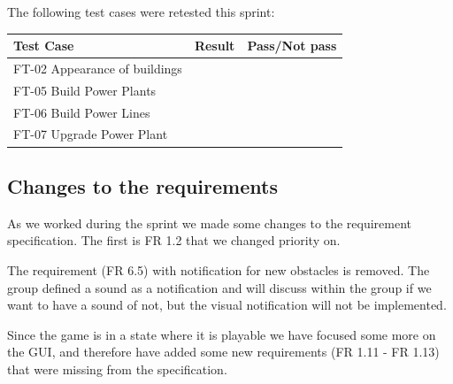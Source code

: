 	The following test cases were retested this sprint:

	\begin{tabular}{| p{3cm} | p{7cm} | p{2cm} |}
		\hline
		\rowcolor{lightgray}
		{\bf Test Case} & {\bf Result} & {\bf Pass/Not pass} \\ \hline

		FT-02  Appearance of buildings & & \\ \hline

	  	FT-05 Build Power Plants &  &  \\ \hline

	  	FT-06 Build Power Lines &  & \\ \hline

	  	FT-07 Upgrade Power Plant &  & \\ \hline
	\end{tabular}

\subsection{Changes to the requirements}

	As we worked during the sprint we made some changes to the requirement specification.
	The first is FR 1.2 that we changed priority on. 

	The requirement (FR 6.5) with notification for new obstacles is removed. 
	The group defined a sound as a notification and will discuss within the group if
	we want to have a sound of not, but the visual notification will not be implemented. 

	Since the game is in a state where it is playable we have focused some more on the 
	GUI, and therefore have added some new requirements (FR 1.11 - FR 1.13) that were missing 
	from the specification.
	
